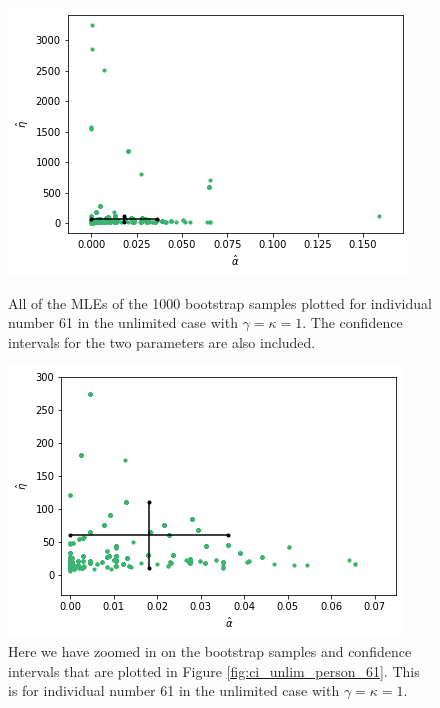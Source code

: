 \begin{figure}
    \centering
    \begin{minipage}{0.48\textwidth}
        \centering
        \includegraphics[scale=0.37]{pictures/ci_unlim_person61.png}
        \caption[MLEs of bootstrap samples individual number 61, unlimited]{All of the MLEs of the 1000 bootstrap samples plotted for individual number 61 in the unlimited case with $\gamma=\kappa=1$. The confidence intervals for the two parameters are also included.}
        \label{fig:ci_unlim_person_61}
    \end{minipage}\hfill
    \begin{minipage}{0.48\textwidth}
        \centering
        \includegraphics[scale=0.37]{pictures/ci_unlim_person61_zoomed.png}
        \caption[MLEs of bootstrap samples individual number 61, unlimited, zoomed]{Here we have zoomed in on the bootstrap samples and confidence intervals that are plotted in Figure \ref{fig:ci_unlim_person_61}. This is for individual number 61 in the unlimited case with $\gamma=\kappa=1$.}
        \label{fig:ci_unlim_person_61_zoomed}
    \end{minipage}
\end{figure}

